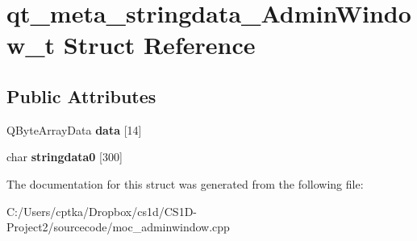 \hypertarget{structqt__meta__stringdata___admin_window__t}{}\section{qt\+\_\+meta\+\_\+stringdata\+\_\+\+Admin\+Window\+\_\+t Struct Reference}
\label{structqt__meta__stringdata___admin_window__t}
\subsection*{Public Attributes}
\begin{DoxyCompactItemize}
\item 
\mbox{\label{structqt__meta__stringdata___admin_window__t_aa0c4cd608525ea724be74438e8588c98}} 
Q\+Byte\+Array\+Data {\bfseries data} \mbox{[}14\mbox{]}
\item 
\mbox{\label{structqt__meta__stringdata___admin_window__t_a10ed3ac6f07e4090186337d9ebea1b32}} 
char {\bfseries stringdata0} \mbox{[}300\mbox{]}
\end{DoxyCompactItemize}


The documentation for this struct was generated from the following file\+:\begin{DoxyCompactItemize}
\item 
C\+:/\+Users/cptka/\+Dropbox/cs1d/\+C\+S1\+D-\/\+Project2/sourcecode/moc\+\_\+adminwindow.\+cpp\end{DoxyCompactItemize}
